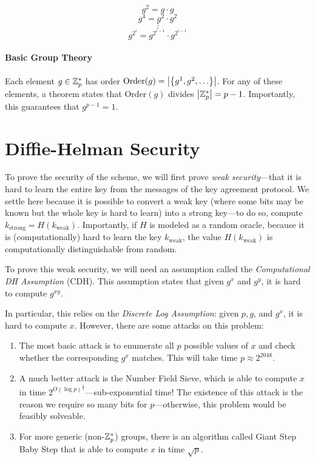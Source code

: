 \[ g^2 = g\cdot g \] \[ g^4 = g^2 \cdot g^2 \]  \[ \vdots \] \[ g^{2^i} = g^{2^{i-1}} \cdot g^{2^{i-1}} \]

\paragraph{Basic Group Theory}
Each element $g \in \mathbb{Z}_p^*$ has order $\text{Order}(g) = \left| \left\{ g^1, g^2, \ldots  \right\} \right|$. For any of these elements, a theorem states that $\text{Order}(g)$ divides $\left| \mathbb{Z}_p^* \right| = p-1$. Importantly, this guarantees that $g^{p-1} = 1$.

\section{Diffie-Helman Security}
To prove the security of the scheme, we will first prove \emph{weak security}---that it is hard to learn the entire key from the messages of the key agreement protocol. We settle here because it is possible to convert a weak key (where some bits may be known but the whole key is hard to learn) into a strong key---to do so, compute $k_\text{strong} = H(k_\text{weak})$. Importantly, if $H$ is modeled as a random oracle, because it is (computationally) hard to learn the key $k_\text{weak}$, the value $H(k_\text{weak})$ is computationally distinguishable from random.

To prove this weak security, we will need an assumption called the \emph{Computational DH Assumption} (CDH). This assumption states that given $g^x$ and $g^y$, it is hard to compute $g^{xy}$.

In particular, this relies on the \emph{Discrete Log Assumption}: given $p, g$, and $g^x$, it is hard to compute $x$. However, there are some attacks on this problem:

\begin{enumerate}
	\item The most basic attack is to enumerate all $p$ possible values of $x$ and check whether the corresponding $g^x$ matches. This will take time $p \approx 2^{2048}$.
	\item A much better attack is the Number Field Sieve, which is able to compute $x$ in time $2^{O(\log p)^{\frac{1}{3}}}$---sub-exponential time! The existence of this attack is the reason we require so many bits for $p$---otherwise, this problem would be feasibly solveable.
	\item For more generic (non-$\mathbb{Z}_p^*$) groups, there is an algorithm called Giant Step Baby Step that is able to compute $x$ in time $\sqrt{p}$.
\end{enumerate}

